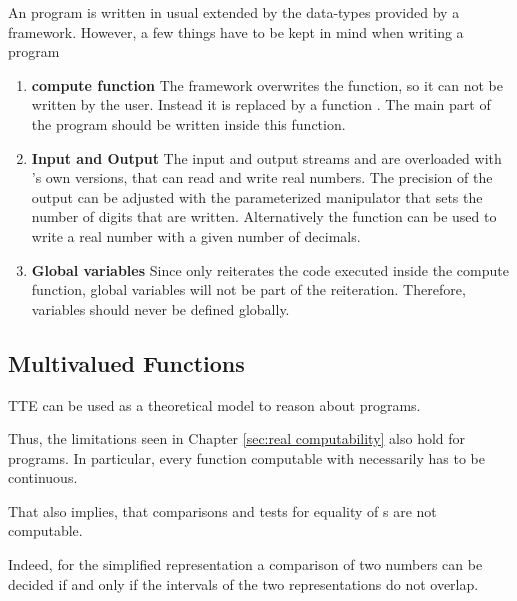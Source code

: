		An \irram program is written in usual \cc extended by the data-types provided by a framework.
		However, a few things have to be kept in mind when writing a program
		\begin{enumerate}
      \item \textbf{compute function}
        The \irram framework overwrites the \cc {} function, so
        it can not be written by the user.
        Instead it is replaced by a function .
        The main part of the program should be written inside this function. 
      \item \textbf{Input and Output}
        The input and output streams  and  are overloaded
        with {\irram}'s own versions, that can read and write real numbers. 
        The precision of the output can be adjusted with the parameterized
        manipulator  that sets the number of digits that are
        written. 
        Alternatively the function  can be used
        to write a real number with a given number of decimals.
      \item \textbf{Global variables} Since \irram only reiterates the code
        executed inside the compute function, global variables will not be part of the
        reiteration. Therefore, \real variables should never be defined
        globally.
		\end{enumerate}
	\subsection{Multivalued Functions}
		TTE can be used as a theoretical model to reason about \irram programs.

		Thus, the limitations seen in Chapter \ref{sec:real computability} also hold for \irram programs.  
		In particular, every function computable with \irram necessarily has to be continuous.
		
		That also implies, that comparisons and tests for equality of {\real}s are not computable.

		Indeed, for the simplified representation a comparison of two numbers can be decided
    if and only if the intervals of the two representations do not overlap.

